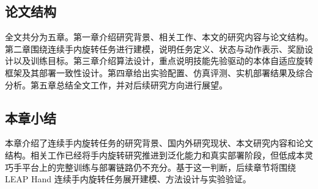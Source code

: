 \subsection{论文结构}
\thesisbodyfont
全文共分为五章。第一章介绍研究背景、相关工作、本文的研究内容与论文结构。第二章围绕连续手内旋转任务进行建模，说明任务定义、状态与动作表示、奖励设计以及训练目标。第三章介绍算法设计，重点说明技能先验驱动的本体自适应旋转框架及其部署一致性设计。第四章给出实验配置、仿真评测、实机部署结果及综合分析。第五章总结全文工作，并对后续研究方向进行展望。

\subsection{本章小结}
\thesisbodyfont
本章介绍了连续手内旋转任务的研究背景、国内外研究现状、本文研究内容和论文结构。相关工作已经将手内旋转研究推进到泛化能力和真实部署阶段，但低成本灵巧手平台上的完整训练与部署链路仍不充分。基于这一判断，后续章节将围绕 LEAP Hand 连续手内旋转任务展开建模、方法设计与实验验证。
